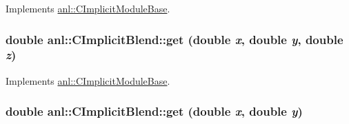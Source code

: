 Implements \hyperlink{classanl_1_1CImplicitModuleBase_a3cf520bdab59631864253c03b4e1723f}{anl::CImplicitModuleBase}.\hypertarget{classanl_1_1CImplicitBlend_a446d55152cda96d074d03055383c7f0d}{
\subsubsection[{get}]{\setlength{\rightskip}{0pt plus 5cm}double anl::CImplicitBlend::get (double {\em x}, \/  double {\em y}, \/  double {\em z})}}
\label{classanl_1_1CImplicitBlend_a446d55152cda96d074d03055383c7f0d}


Implements \hyperlink{classanl_1_1CImplicitModuleBase_ac17d592612c82ba3d47f9229a00b1fe3}{anl::CImplicitModuleBase}.\hypertarget{classanl_1_1CImplicitBlend_a24ce6a5991691901f1db4d8c7a78089e}{
\subsubsection[{get}]{\setlength{\rightskip}{0pt plus 5cm}double anl::CImplicitBlend::get (double {\em x}, \/  double {\em y})}}
\label{classanl_1_1CImplicitBlend_a24ce6a5991691901f1db4d8c7a78089e}


